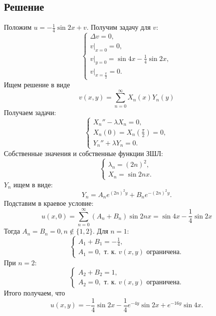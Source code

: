 \documentclass[11pt]{article}
\begin{document}
\subsection{Решение}
\label{sec:org1b63789}
 Положим $u = -\frac14\sin2x + v$. Получим задачу для $v$:
 \begin{equation*}
 \begin{cases}
 \Delta v = 0, \\
 v|_{x = 0} = 0, \\
 v|_{y = 0} = \sin4x - \frac14\sin2x, \\
 v|_{x = \frac{\pi}2} = 0.
 \end{cases}
 \end{equation*}
 Ищем решение в виде
 \begin{equation*}
 v(x, y) = \sum_{n = 0}^{\infty}X_n(x)Y_n(y)
 \end{equation*}
 Получаем задачи:
 \begin{equation*}
 \begin{cases}
 X_n'' - \lambda X_n = 0, \\
 X_n(0) = X_n\left(\frac{\pi}2\right) = 0, \\
 Y_n'' + \lambda Y_n = 0.
 \end{cases}
 \end{equation*}
 Собственные значения и собственные функции ЗШЛ:
 \begin{equation*}
 \begin{cases}
 \lambda_n = (2n)^2, \\
 X_n = \sin2nx.
 \end{cases}
 \end{equation*}
$Y_n$ ищем в виде:
\begin{equation*}
Y_n = A_ne^{(2n)^2y} + B_ne^{-(2n)^2y}.
\end{equation*}
Подставим в краевое условие:
\begin{equation*}
u(x, 0) = \sum_{n = 0}^{\infty}(A_n + B_n)\sin2nx = \sin4x - \frac14\sin2x
\end{equation*}
Тогда $A_n = B_n = 0, n \notin \{1, 2\}$. Для $n = 1$:
\begin{equation*}
\begin{cases}
A_1 + B_1 = -\frac14, \\
A_1 = 0, \text{ т. к. } v(x, y) \text{ ограничена.}
\end{cases}
\end{equation*}
При $n = 2$:
\begin{equation*}
\begin{cases}
A_2 + B_2 = 1, \\
A_2 = 0, \text{ т. к. } v(x, y) \text{ ограничена.}
\end{cases}
\end{equation*}
Итого получаем, что
\begin{equation}
u(x, y) = -\frac14\sin2x - \frac14e^{-4y}\sin2x + e^{-16y}\sin4x.
\end{equation}
\end{document}

